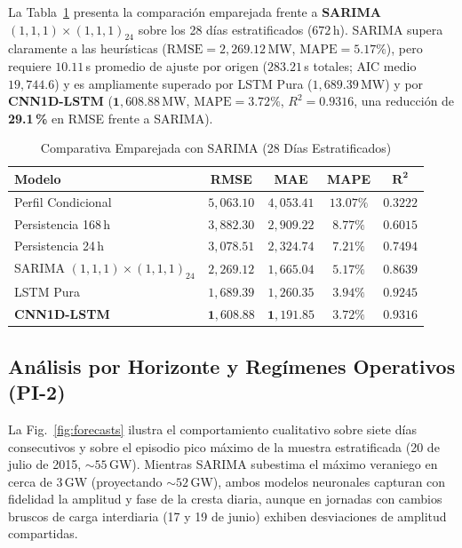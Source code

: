 \documentclass[conference]{IEEEtran}
\begin{document}
La Tabla~\ref{tab:sarima_matched} presenta la comparación emparejada frente a \textbf{SARIMA$(1,1,1)\times(1,1,1)_{24}$} sobre los 28 días estratificados ($672$\,h). SARIMA supera claramente a las heurísticas ($\text{RMSE}=2{,}269.12$\,MW, $\text{MAPE}=5.17\%$), pero requiere $10.11$\,s promedio de ajuste por origen ($283.21$\,s totales; AIC medio $19{,}744.6$) y es ampliamente superado por LSTM Pura ($1{,}689.39$\,MW) y por \textbf{CNN1D-LSTM} ($\mathbf{1{,}608.88}$\,MW, $\text{MAPE}=3.72\%$, $R^2=0.9316$, una reducción de \textbf{29.1\,\%} en RMSE frente a SARIMA).

\begin{table}[htbp]
\centering
\caption{Comparativa Emparejada con SARIMA (28 Días Estratificados)}
\label{tab:sarima_matched}
\scriptsize
\setlength{\tabcolsep}{3pt}
\begin{tabularx}{\columnwidth}{>{\raggedright\arraybackslash}X c c c c}
\toprule
\textbf{Modelo} & \textbf{RMSE} & \textbf{MAE} & \textbf{MAPE} & $\mathbf{R^2}$ \\
\midrule
Perfil Condicional & $5{,}063.10$ & $4{,}053.41$ & $13.07\%$ & $0.3222$ \\
Persistencia 168\,h & $3{,}882.30$ & $2{,}909.22$ & $8.77\%$ & $0.6015$ \\
Persistencia 24\,h & $3{,}078.51$ & $2{,}324.74$ & $7.21\%$ & $0.7494$ \\
SARIMA $(1,1,1)\times(1,1,1)_{24}$ & $2{,}269.12$ & $1{,}665.04$ & $5.17\%$ & $0.8639$ \\
LSTM Pura & $1{,}689.39$ & $1{,}260.35$ & $3.94\%$ & $0.9245$ \\
\textbf{CNN1D-LSTM} & $\mathbf{1{,}608.88}$ & $\mathbf{1{,}191.85}$ & $\mathbf{3.72\%}$ & $\mathbf{0.9316}$ \\
\bottomrule
\end{tabularx}
\end{table}

\subsection{Análisis por Horizonte y Regímenes Operativos (PI-2)}
La Fig.~\ref{fig:forecasts} ilustra el comportamiento cualitativo sobre siete días consecutivos y sobre el episodio pico máximo de la muestra estratificada (20 de julio de 2015, $\sim 55$\,GW). Mientras SARIMA subestima el máximo veraniego en cerca de 3\,GW (proyectando $\sim 52$\,GW), ambos modelos neuronales capturan con fidelidad la amplitud y fase de la cresta diaria, aunque en jornadas con cambios bruscos de carga interdiaria (17 y 19 de junio) exhiben desviaciones de amplitud compartidas.
\end{document}
